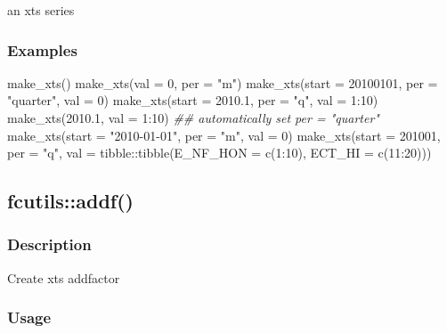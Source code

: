 \documentclass[
  letterpaper,
  DIV=11,
  numbers=noendperiod]{scrreport}
\newenvironment{Shaded}{\begin{snugshade}}{\end{snugshade}}
\newcommand{\AttributeTok}[1]{\textcolor[rgb]{0.40,0.45,0.13}{#1}}
\newcommand{\DecValTok}[1]{\textcolor[rgb]{0.68,0.00,0.00}{#1}}
\newcommand{\DocumentationTok}[1]{\textcolor[rgb]{0.37,0.37,0.37}{\textit{#1}}}
\newcommand{\FloatTok}[1]{\textcolor[rgb]{0.68,0.00,0.00}{#1}}
\newcommand{\FunctionTok}[1]{\textcolor[rgb]{0.28,0.35,0.67}{#1}}
\newcommand{\NormalTok}[1]{\textcolor[rgb]{0.00,0.23,0.31}{#1}}
\newcommand{\SpecialCharTok}[1]{\textcolor[rgb]{0.37,0.37,0.37}{#1}}
\newcommand{\StringTok}[1]{\textcolor[rgb]{0.13,0.47,0.30}{#1}}
\begin{document}
an xts series

\subsubsection{Examples}\label{examples-3}

\begin{Shaded}
\begin{Highlighting}[]
\FunctionTok{make\_xts}\NormalTok{()}
\FunctionTok{make\_xts}\NormalTok{(}\AttributeTok{val =} \DecValTok{0}\NormalTok{, }\AttributeTok{per =} \StringTok{"m"}\NormalTok{)}
\FunctionTok{make\_xts}\NormalTok{(}\AttributeTok{start =} \DecValTok{20100101}\NormalTok{, }\AttributeTok{per =} \StringTok{"quarter"}\NormalTok{, }\AttributeTok{val =} \DecValTok{0}\NormalTok{)}
\FunctionTok{make\_xts}\NormalTok{(}\AttributeTok{start =} \FloatTok{2010.1}\NormalTok{, }\AttributeTok{per =} \StringTok{"q"}\NormalTok{, }\AttributeTok{val =} \DecValTok{1}\SpecialCharTok{:}\DecValTok{10}\NormalTok{)}
\FunctionTok{make\_xts}\NormalTok{(}\FloatTok{2010.1}\NormalTok{, }\AttributeTok{val =} \DecValTok{1}\SpecialCharTok{:}\DecValTok{10}\NormalTok{) }\DocumentationTok{\#\# automatically set per = "quarter"}
\FunctionTok{make\_xts}\NormalTok{(}\AttributeTok{start =} \StringTok{"2010{-}01{-}01"}\NormalTok{, }\AttributeTok{per =} \StringTok{"m"}\NormalTok{, }\AttributeTok{val =} \DecValTok{0}\NormalTok{)}
\FunctionTok{make\_xts}\NormalTok{(}\AttributeTok{start =} \DecValTok{201001}\NormalTok{, }\AttributeTok{per =} \StringTok{"q"}\NormalTok{,}
         \AttributeTok{val =}\NormalTok{ tibble}\SpecialCharTok{::}\FunctionTok{tibble}\NormalTok{(}\AttributeTok{E\_NF\_HON =} \FunctionTok{c}\NormalTok{(}\DecValTok{1}\SpecialCharTok{:}\DecValTok{10}\NormalTok{), }\AttributeTok{ECT\_HI =} \FunctionTok{c}\NormalTok{(}\DecValTok{11}\SpecialCharTok{:}\DecValTok{20}\NormalTok{)))}
\end{Highlighting}
\end{Shaded}

\subsection{fcutils::addf()}\label{fcutilsaddf}

\subsubsection{Description}\label{description-4}

Create xts addfactor

\subsubsection{Usage}\label{usage-4}
\end{document}
